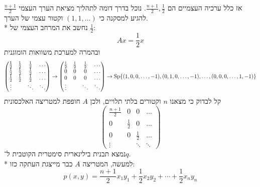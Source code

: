 אז כלל ערכיה העצמיים הם $\frac{n + 1}{2}, \frac{1}{2}$.
נוכל בדרך דומה לתהליך מציאת הערך העצמי $\frac{n + 1}{2}$ להגיע למסקנה כי $(1, 1, \hdots)$ וקטור עצמי של הערך. \\*
נחשב את המרחב העצמי של $\frac{1}{2}$:
\[
	A x = \frac{1}{2} x
\]
ובהמרה למערכת משוואות הומוגנית
\[
	\begin{pmatrix}
		\frac{1}{2} & \frac{1}{2} & \frac{1}{2} & \hdots \\
		\frac{1}{2} & \frac{1}{2} & \frac{1}{2} & \hdots \\
		\frac{1}{2} & \frac{1}{2} & \frac{1}{2} & \hdots \\
		\vdots & & \ddots & \ddots
	\end{pmatrix}
	\rightarrow
	\begin{pmatrix}
		\frac{1}{2} & \frac{1}{2} & \frac{1}{2} & \hdots \\
		0 & 0 & 0 & \hdots \\
		0 & 0 & 0 & \hdots \\
		\vdots & & \ddots & \ddots
	\end{pmatrix}
	\rightarrow
	\operatorname{Sp}\{ (1, 0, 0, \hdots, -1), (0, 1, 0, \hdots, -1), \hdots, (0, 0, 0, \hdots, 1, -1) \}
\]
קל לבדוק כי מצאנו $n$ וקטורים בלתי תלויים, ולכן $A$ חופפת למטריצה האלכסונית
\[
	\begin{pmatrix}
		\frac{n + 1}{2}  & 0 & 0 & \hdots \\
		0 & \frac{1}{2} & 0 & \hdots \\
		0 & 0 & \frac{1}{2} & \hdots \\
		\vdots & & \ddots & \ddots
	\end{pmatrix}
\]
נמצא תבנית בילינארית סימטרית הקוטבית ל־$q$. \\*
למעשה, המטריצה $A$ כבר מייצגת העתקה כזו:
\[
	p(x, y) = \frac{n + 1}{2} x_1 y_1 + \frac{1}{2} x_2 y_2 + \cdots + \frac{1}{2} x_n y_n
\]

